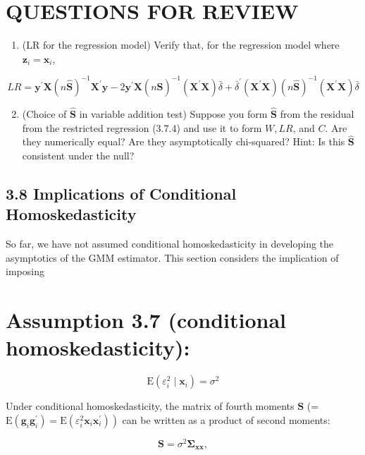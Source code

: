 \documentclass[10pt]{article}
\begin{document}
\section*{QUESTIONS FOR REVIEW}
\begin{enumerate}
  \item (LR for the regression model) Verify that, for the regression model where $\mathbf{z}_{i}=\mathbf{x}_{i}$,
\end{enumerate}

$$
L R=\mathbf{y}^{\prime} \mathbf{X}(n \widehat{\mathbf{S}})^{-1} \mathbf{X}^{\prime} \mathbf{y}-2 \mathbf{y}^{\prime} \mathbf{X}(n \widehat{\mathbf{S}})^{-1}\left(\mathbf{X}^{\prime} \mathbf{X}\right) \bar{\delta}+\bar{\delta}^{\prime}\left(\mathbf{X}^{\prime} \mathbf{X}\right)(n \widehat{\mathbf{S}})^{-1}\left(\mathbf{X}^{\prime} \mathbf{X}\right) \bar{\delta}
$$

\begin{enumerate}
  \setcounter{enumi}{1}
  \item (Choice of $\widehat{\mathbf{S}}$ in variable addition test) Suppose you form $\widehat{\mathbf{S}}$ from the residual from the restricted regression (3.7.4) and use it to form $W, L R$, and $C$. Are they numerically equal? Are they asymptotically chi-squared? Hint: Is this $\widehat{\mathbf{S}}$ consistent under the null?
\end{enumerate}

\subsection*{3.8 Implications of Conditional Homoskedasticity}
So far, we have not assumed conditional homoskedasticity in developing the asymptotics of the GMM estimator. This section considers the implication of imposing

\section*{Assumption 3.7 (conditional homoskedasticity):}
$$
\mathrm{E}\left(\varepsilon_{i}^{2} \mid \mathbf{x}_{i}\right)=\sigma^{2}
$$

Under conditional homoskedasticity, the matrix of fourth moments $\mathbf{S}$ (= $\left.\mathrm{E}\left(\mathbf{g}_{i} \mathbf{g}_{i}^{\prime}\right)=\mathrm{E}\left(\varepsilon_{i}^{2} \mathbf{x}_{i} \mathbf{x}_{i}^{\prime}\right)\right)$ can be written as a product of second moments:


\begin{equation*}
\mathbf{S}=\sigma^{2} \mathbf{\Sigma}_{\mathbf{x x}}, \tag{3.8.1}
\end{equation*}
\end{document}
